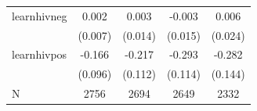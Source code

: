 \begin{tabular}{lcccc}
\hline
learnhivneg & 0.002 & 0.003 & -0.003 & 0.006 \\
 & (0.007) & (0.014) & (0.015) & (0.024) \\
learnhivpos & -0.166 & -0.217 & -0.293 & -0.282 \\
 & (0.096) & (0.112) & (0.114) & (0.144) \\
\hline
N & 2756 & 2694 & 2649 & 2332 \\
\hline
\end{tabular}
